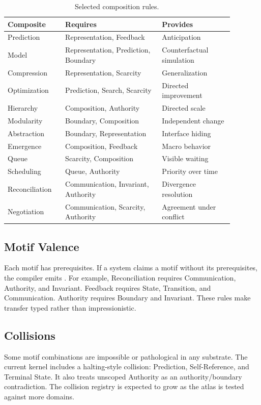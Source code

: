 \documentclass[11pt]{article}
\newcommand{\code}[1]{\texttt{\detokenize{#1}}}
\begin{document}
\begin{table}[h]
\centering
\caption{Selected composition rules.}
\label{tab:composition}
\small
\begin{tabular}{L{0.22\linewidth}L{0.38\linewidth}L{0.28\linewidth}}
\toprule
Composite & Requires & Provides \\
\midrule
Prediction & Representation, Feedback & Anticipation \\
Model & Representation, Prediction, Boundary & Counterfactual simulation \\
Compression & Representation, Scarcity & Generalization \\
Optimization & Prediction, Search, Scarcity & Directed improvement \\
Hierarchy & Composition, Authority & Directed scale \\
Modularity & Boundary, Composition & Independent change \\
Abstraction & Boundary, Representation & Interface hiding \\
Emergence & Composition, Feedback & Macro behavior \\
Queue & Scarcity, Composition & Visible waiting \\
Scheduling & Queue, Authority & Priority over time \\
Reconciliation & Communication, Invariant, Authority & Divergence resolution \\
Negotiation & Communication, Scarcity, Authority & Agreement under conflict \\
\bottomrule
\end{tabular}
\end{table}

\subsection{Motif Valence}

Each motif has prerequisites. If a system claims a motif without its
prerequisites, the compiler emits \code{MIRACLE}. For example,
Reconciliation requires Communication, Authority, and Invariant. Feedback
requires State, Transition, and Communication. Authority requires Boundary and
Invariant. These rules make transfer typed rather than impressionistic.

\subsection{Collisions}

Some motif combinations are impossible or pathological in any substrate. The
current kernel includes a halting-style collision:
Prediction, Self-Reference, and Terminal State. It also treats unscoped
Authority as an authority/boundary contradiction. The collision registry is
expected to grow as the atlas is tested against more domains.
\end{document}
